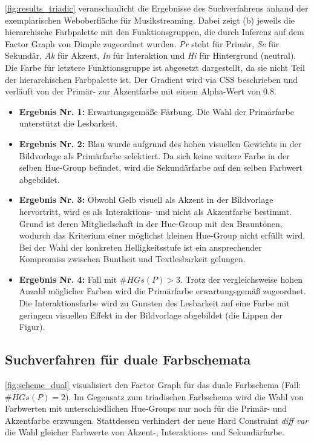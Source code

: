 \autoref{fig:results_triadic} veranschaulicht die Ergebnisse des Suchverfahrens anhand der exemplarischen Weboberfläche für Musikstreaming. Dabei zeigt (b) jeweils die hierarchische Farbpalette mit den Funktionsgruppen, die durch Inferenz auf dem Factor Graph von Dimple zugeordnet wurden. \emph{Pr} steht für Primär, \emph{Se} für Sekundär, \emph{Ak} für Akzent, \emph{In} für Interaktion und \emph{Hi} für Hintergrund (neutral). Die Farbe für letztere Funktionsgruppe ist abgesetzt dargestellt, da sie nicht Teil der hierarchischen Farbpalette ist. Der Gradient wird via CSS beschrieben und verläuft von der Primär- zur Akzentfarbe mit einem Alpha-Wert von 0.8.

\begin{itemize}
	\item \textbf{Ergebnis Nr. 1:} Erwartungsgemäße Färbung. Die Wahl der Primärfarbe unterstützt die Lesbarkeit.
	\item \textbf{Ergebnis Nr. 2:} Blau wurde aufgrund des hohen visuellen Gewichts in der Bildvorlage als Primärfarbe selektiert. Da sich keine weitere Farbe in der selben Hue-Group befindet, wird die Sekundärfarbe auf den selben Farbwert abgebildet.
	 \item \textbf{Ergebnis Nr. 3:} Obwohl Gelb visuell  als Akzent in der Bildvorlage hervortritt, wird es als Interaktions- und nicht als Akzentfarbe bestimmt. Grund ist deren Mitgliedschaft in der Hue-Group mit den Brauntönen, wodurch das Kriterium einer möglichst kleinen Hue-Group nicht erfüllt wird. Bei der Wahl der konkreten Helligkeitsstufe ist ein ansprechender Kompromiss zwischen Buntheit und Textlesbarkeit gelungen.
	 \item \textbf{Ergebnis Nr. 4:} Fall mit $\#HGs(P) > 3$. Trotz der vergleichsweise hohen Anzahl möglicher Farben wird die Primärfarbe erwartungsgemäß zugeordnet. Die Interaktionsfarbe wird zu Gunsten des Lesbarkeit auf eine Farbe mit geringem visuellen Effekt in der Bildvorlage abgebildet (die Lippen der Figur).
\end{itemize}

\subsection{Suchverfahren für duale Farbschemata}

\autoref{fig:scheme_dual} visualisiert den Factor Graph für das duale Farbschema (Fall: $\#HGs(P) = 2$). Im Gegensatz zum triadischen Farbschema wird die Wahl von Farbwerten mit unterschiedlichen Hue-Groups nur noch für die Primär- und Akzentfarbe erzwungen. Stattdessen verhindert der neue Hard Constraint \emph{diff var} die Wahl gleicher Farbwerte von Akzent-, Interaktions- und Sekundärfarbe.
 

